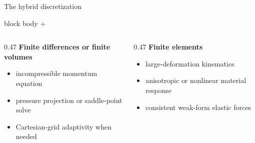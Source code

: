 \documentclass[aspectratio=169,11pt]{beamer}
\begin{document}
\begin{frame}{The hybrid discretization}
\vspace{0.4em}
\begin{beamercolorbox}[wd=\textwidth,sep=9pt,center,rounded=true]{block body}
{\Large {}}
\qquad \(+\) \qquad
{\Large {}}
\end{beamercolorbox}

\vspace{1.0em}
\begin{columns}[T,onlytextwidth]
\begin{column}{0.47\textwidth}
\textbf{Finite differences or finite volumes}
\begin{itemize}\itemsep5pt
  \item incompressible momentum equation
  \item pressure projection or saddle-point solve
  \item Cartesian-grid adaptivity when needed
\end{itemize}
\end{column}
\begin{column}{0.47\textwidth}
\textbf{Finite elements}
\begin{itemize}\itemsep5pt
  \item large-deformation kinematics
  \item anisotropic or nonlinear material response
  \item consistent weak-form elastic forces
\end{itemize}
\end{column}
\end{columns}

\vfill
\centering
{}
\end{frame}
\end{document}
